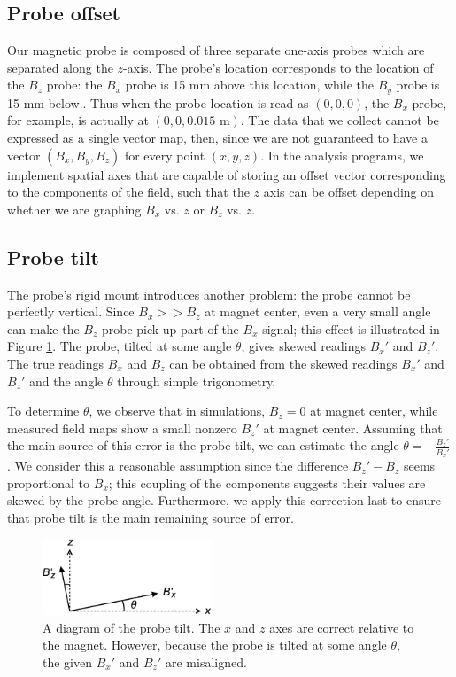 \documentclass[twocolumn,aps,prb,citeautoscript]{revtex4-1}
\begin{document}
\subsection{Probe offset}

Our magnetic probe is composed of three separate one-axis probes which are separated along the $z$-axis.
The probe's location corresponds to the location of the $B_z$ probe: the $B_x$ probe is 15 mm above this location,
while the $B_y$ probe is 15 mm below.. Thus when the probe location is read as
$(0, 0, 0)$, the $B_x$ probe, for example, is actually at $(0, 0, 0.015\text{ m})$. The data that we collect
cannot be expressed as a single vector map, then, since we are not guaranteed to have a vector $(B_x, B_y, B_z)$
for every point $(x, y, z)$. In the analysis programs, we implement spatial axes that are
capable of storing an offset vector corresponding to the components
of the field, such that the $z$ axis can be offset depending on whether we are graphing $B_x$ vs. $z$ or
$B_z$ vs. $z$.

\subsection{Probe tilt}

The probe's rigid mount introduces another problem: the probe cannot be perfectly vertical.
Since $B_x >> B_z$ at
magnet center, even a very small angle can make the $B_z$ probe pick up part of the $B_x$ signal;
this effect is illustrated in
Figure \ref{fig:angle}. The probe, tilted at some angle $\theta$, gives skewed readings $B_x'$ and $B_z'$.
The true readings $B_x$ and $B_z$ can be obtained from the skewed readings $B_x'$ and $B_z'$ and the angle
$\theta$ through simple trigonometry.

To determine $\theta$, we observe that in simulations, $B_z = 0$ at magnet center, while measured field maps
show a small nonzero $B_z'$ at magnet center. Assuming that the main source of this error is the probe tilt,
we can estimate the angle $\theta = -\frac{B_z'}{B_x'}$. We consider this a reasonable assumption since
the difference $B_z' - B_z$ seems proportional to $B_x$; this coupling of the components suggests their values
are skewed by the probe angle. Furthermore, we apply this correction last to ensure that probe tilt is the main
remaining source of error.

\begin{figure}
\vspace{15pt}
\includegraphics[width=0.45\textwidth]{figures/probe_tilt.eps}
\caption{\label{fig:angle} A diagram of the probe tilt. The $x$ and $z$ axes are correct relative
to the magnet. However, because the probe is tilted at some angle $\theta$, the given $B_x'$ and $B_z'$
are misaligned.}
\end{figure}
\end{document}
